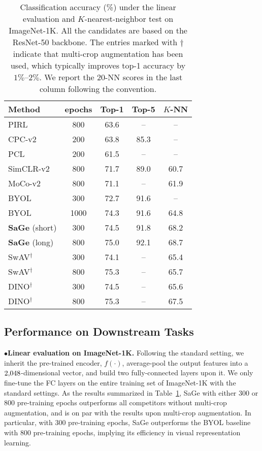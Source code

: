\documentclass[10pt,twocolumn,letterpaper]{article}
\begin{document}
\begin{table}[!t]
\fontsize{9.5}{11.0}\selectfont
\centering
\setlength{\tabcolsep}{2.5mm}
\begin{tabular}{l|c|cc|c}
\toprule
Method   & epochs  & Top-1  & Top-5 & $K$-NN \\
\midrule
PIRL~\cite{misra2020self} &800&63.6 &--&--\\
CPC-v2~\cite{henaff2019data}&200&63.8  &85.3&--\\
PCL~\cite{li2020prototypical}&200 &61.5 &--&--\\
SimCLR-v2~\cite{chen2020big} &800&71.7  &89.0&60.7\\
MoCo-v2~\cite{chen2020improved} &800 &71.1 &--&61.9\\
BYOL~\cite{grill2020bootstrap} &300 &72.7  &91.6&--\\
BYOL~\cite{grill2020bootstrap} &1000 &74.3  &91.6&64.8\\
\midrule
\textbf{SaGe} (short)  &300  &74.5  &91.8  &68.2\\
\textbf{SaGe} (long)  &800  &75.0  &92.1 & 68.7\\
\midrule
SwAV$^\dagger$~\cite{caron2020unsupervised} &300 &74.1 &-- &65.4\\
SwAV$^\dagger$~\cite{caron2020unsupervised} &800 &75.3 &-- &65.7\\
DINO$^\dagger$~\cite{caron2021emerging}  &300  &74.5 &-- &65.6\\
DINO$^\dagger$~\cite{caron2021emerging}  &800 &75.3 &-- &67.5\\
\bottomrule
\end{tabular}
\caption{Classification accuracy (\%) under the linear evaluation and $K$-nearest-neighbor test on ImageNet-1K. All the candidates are based on the ResNet-50 backbone. The entries marked with $\dagger$ indicate that multi-crop augmentation has been used, which typically improves top-1 accuracy by $1\%$--$2\%$. We report the 20-NN scores in the last column following the convention.}
\label{tab:lincls_imagenet1K}
\end{table}

\subsection{Performance on Downstream Tasks}

\noindent
$\bullet$\hspace{0.2cm}\textbf{Linear evaluation on ImageNet-1K.} Following the standard setting, we inherit the pre-trained encoder, $f(\cdot)$, average-pool the output features into a $2\rm{,}048$-dimensional vector, and build two fully-connected layers upon it. We only fine-tune the FC layers on the entire training set of ImageNet-1K with the standard settings. As the results summarized in Table~\ref{tab:lincls_imagenet1K}, SaGe with either $300$ or $800$ pre-training epochs outperforms all competitors without multi-crop augmentation, and is on par with the results upon multi-crop augmentation. In particular, with $300$ pre-training epochs, SaGe outperforms the BYOL baseline with $800$ pre-training epochs, implying its efficiency in visual representation learning.
\end{document}
